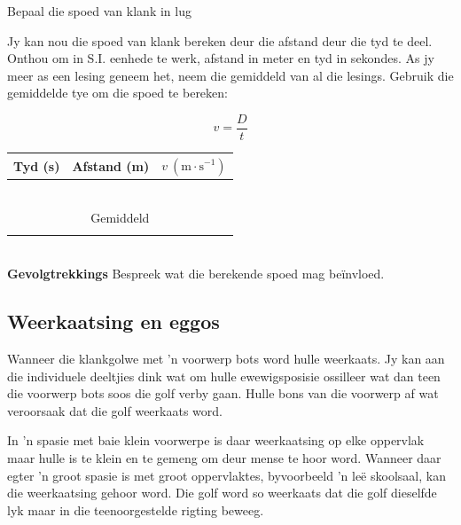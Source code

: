 \begin{i_experiment}{Bepaal die spoed van klank in lug}
\begin{minipage}{.45\textwidth}
Jy kan nou die spoed van klank bereken deur die afstand deur die tyd te deel. Onthou om in S.I. eenhede te werk, afstand in meter en tyd in sekondes. As jy meer as een lesing geneem het, neem die gemiddeld van al die lesings. Gebruik die gemiddelde tye om die spoed te bereken: 

\begin{equation*}
 v = \frac{D}{t}
\end{equation*}
\end{minipage}\hspace{.03\textwidth}
\begin{minipage}{.5\textwidth}
\begin{table}[H]
 \begin{tabular}{|c|c|c|}\hline\hline
Tyd (s) & Afstand (m) & $v~(\text{m}\cdot\text{s}^{-1})$ \\\hline
 & & \\\hline 
 & & \\\hline 
 & & \\\hline 
 & & \\\hline 
 & & \\\hline 
 & & \\\hline \hline
\multicolumn{3}{|c|}{Gemiddeld} \\ \hline
 & & \\\hline 
 \end{tabular}
\end{table}
\end{minipage}\\
\textbf{Gevolgtrekkings}
Bespreek wat die berekende spoed mag be\"{i}nvloed.
\end{i_experiment}

\subsection{Weerkaatsing en eggos}

Wanneer die klankgolwe met 'n voorwerp bots word hulle weerkaats. Jy kan aan die individuele deeltjies dink wat om hulle ewewigsposisie ossilleer wat dan teen die voorwerp bots soos die golf verby gaan. Hulle bons van die voorwerp af wat veroorsaak dat die golf weerkaats word.

In 'n spasie met baie klein voorwerpe is daar weerkaatsing op elke oppervlak maar hulle is te klein en te gemeng om deur mense te hoor word. Wanneer daar egter 'n groot spasie is met groot oppervlaktes, byvoorbeeld 'n le\"e skoolsaal, kan die weerkaatsing gehoor word. Die golf word so weerkaats dat die golf dieselfde lyk maar in die teenoorgestelde rigting beweeg.

